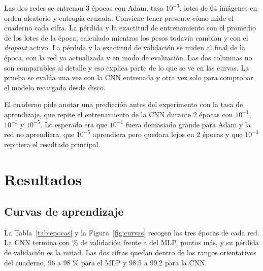\documentclass[11pt,letterpaper]{article}
\begin{document}
Las dos redes se entrenan 3 épocas con Adam, tasa $10^{-3}$, lotes de 64 imágenes en orden aleatorio y entropía cruzada. Conviene tener presente cómo mide el cuaderno cada cifra. La pérdida y la exactitud de entrenamiento son el promedio de los lotes de la época, calculado mientras los pesos todavía cambian y con el \emph{dropout} activo. La pérdida y la exactitud de validación se miden al final de la época, con la red ya actualizada y en modo de evaluación. Las dos columnas no son comparables al detalle y eso explica parte de lo que se ve en las curvas. La prueba se evalúa una vez con la CNN entrenada y otra vez solo para comprobar el modelo recargado desde disco.

El cuaderno pide anotar una predicción antes del experimento con la tasa de aprendizaje, que repite el entrenamiento de la CNN durante 2 épocas con $10^{-1}$, $10^{-3}$ y $10^{-5}$. Lo esperado era que $10^{-1}$ fuera demasiado grande para Adam y la red no aprendiera, que $10^{-5}$ aprendiera pero quedara lejos en 2 épocas y que $10^{-3}$ repitiera el resultado principal.

\section{Resultados}

\subsection{Curvas de aprendizaje}

La Tabla~\ref{tab:epocas} y la Figura~\ref{fig:curvas} recogen las tres épocas de cada red. La CNN termina con \vaccCnnC{} \% de validación frente a \vaccMlpC{} del MLP, \difVal{} puntos más, y su pérdida de validación es la mitad. Las dos cifras quedan dentro de los rangos orientativos del cuaderno, 96 a 98 \% para el MLP y 98.5 a 99.2 para la CNN.
\end{document}
